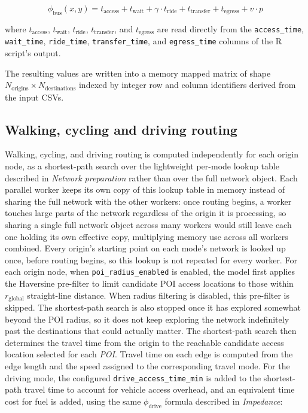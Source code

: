 \documentclass{article}
\begin{document}
\begin{equation}
    \phi_{\text{bus}}(x,y) = t_{\text{access}} + t_{\text{wait}} + \gamma \cdot t_{\text{ride}} + t_{\text{transfer}} + t_{\text{egress}} + v \cdot p
\end{equation}

\noindent where \(t_{\text{access}}\), \(t_{\text{wait}}\), \(t_{\text{ride}}\),
\(t_{\text{transfer}}\), and \(t_{\text{egress}}\) are read directly from the
\texttt{access\_time}, \texttt{wait\_time}, \texttt{ride\_time},
\texttt{transfer\_time}, and \texttt{egress\_time} columns of the R script's
output.

The resulting values are written into a memory mapped matrix of shape
\(N_{\text{origins}} \times N_{\text{destinations}}\) indexed by integer row
and column identifiers derived from the input CSVs.

\subsection{Walking, cycling and driving routing}
Walking, cycling, and driving routing is computed independently for each origin node, as a shortest-path search over the
lightweight per-mode lookup table described in \emph{Network preparation}
rather than over the full network object. Each parallel worker keeps its own
copy of this lookup table in memory instead of sharing the full network with
the other workers: once routing begins, a worker touches large parts of the
network regardless of the origin it is processing, so sharing a single full
network object across many workers would still leave each one holding its
own effective copy, multiplying memory use across all workers combined.
Every origin's starting point on each mode's network
is looked up once, before routing begins, so this lookup is not repeated for
every worker. For each origin node, when \texttt{poi\_radius\_enabled} is enabled, the model
first applies the Haversine pre-filter to limit candidate POI access locations
to those within \(r_{\text{global}}\) straight-line distance. When radius
filtering is disabled, this pre-filter is skipped. The shortest-path
search is also stopped once it has explored somewhat beyond the POI radius,
so it does not keep exploring the network indefinitely past the destinations
that could actually matter.
The shortest-path search then determines the travel time from the origin to the reachable candidate access location selected for each \emph{POI}.
Travel time on each edge is computed from the edge length and the speed assigned to the corresponding travel mode. For the driving mode, the configured
\texttt{drive\_access\_time\_min} is added to the shortest-path travel time to
account for vehicle access overhead, and an equivalent time cost for fuel is
added, using the same \(\phi_{\text{drive}}\) formula described in
\emph{Impedance}:
\end{document}
